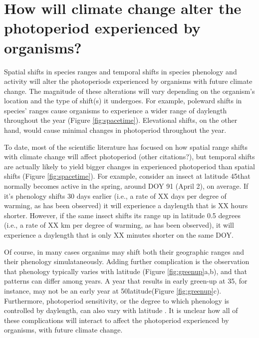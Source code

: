 \documentclass{article}
\begin{document}
\section*{How will climate change alter the photoperiod experienced by organisms?}
\par Spatial shifts in species ranges and temporal shifts in species phenology and activity will alter the photoperiods experienced by organisms with future climate change. The magnitude of these alterations will vary depending on the organism's location and the type of shift(s) it undergoes. For example, poleward shifts in species' ranges cause organisms to experience a wider range of daylength throughout the year (Figure \ref{fig:spacetime}). Elevational shifts, on the other hand, would cause minimal changes in photoperiod throughout the year. 
\par To date, most of the scientific literature has focused on how spatial range shifts with climate change will affect photoperiod \citep{saikkonen2012} (other citations?), but temporal shifts are actually likely to yield bigger changes in experienced photoperiod than spatial shifts (Figure \ref{fig:spacetime}). For example, consider an insect at latitude 45\degree that normally becomes active in the spring, around DOY 91 (April 2), on average. If it's phenology shifts 30 days earlier (i.e., a rate of XX days per degree of warming, as has been observed) it will experience a daylength that is XX hours shorter. However, if the same insect shifts its range up in latitude 0.5 degrees (i.e., a rate of XX km per degree of warming, as has been observed), it will experience a daylength that is only XX minutes shorter on the same DOY. 
\par Of course, in many cases organims may shift both their geographic ranges and their phenology simulataneously. Adding further complication is the observation that phenology typically varies with latitude (Figure \ref{fig:greenup}a,b), and that patterns can differ among years. A year that results in early green-up at 35\degree, for instance, may not be an early year at 50\degree latitude(Figure \ref{fig:greenup}c). Furthermore, photoperiod sensitivity, or the degree to which phenology is controlled by daylength, can also vary with latitude \citep{Howe:1996,saikkonen2012,Partanen:2005aa,Vihera-Aarnio:2006aa,Caffarra:2011b,gauzere2017}. It is unclear how all of these complications will interact to affect the photoperiod experienced by organisms, with future climate change.
\end{document}
